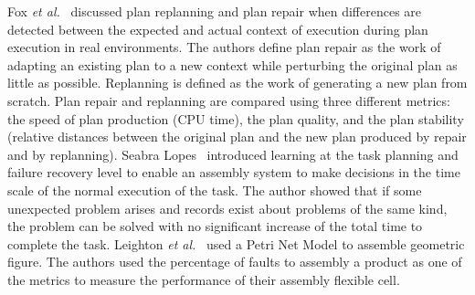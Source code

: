Fox \textit{et al.}~\cite{Fox.2006} discussed plan replanning and plan repair when differences are detected between the expected and actual context of execution during plan execution in real environments. The authors define plan repair as the work of adapting an existing plan to a new context while perturbing the original plan as little as possible. Replanning is defined as the work of generating a new plan from scratch. Plan repair and replanning are compared using three different metrics: the speed of plan production (CPU time), the plan quality, and the plan stability (relative distances between the original plan and the new plan produced by repair and by replanning).
Seabra Lopes~\cite{SeabraLopes.1999} introduced learning at the task planning and failure recovery level to enable an assembly system to make decisions in the time scale of the normal
execution of the task. The author showed that if some unexpected problem arises and records exist about problems of the same kind, the problem can be solved with no significant increase of the total time to complete the task.
Leighton \textit{et al.}~\cite{Leighton.2011} used a Petri Net Model to assemble geometric figure. The authors used the percentage of faults to assembly a product as one of the metrics to measure the performance of their assembly flexible cell.

